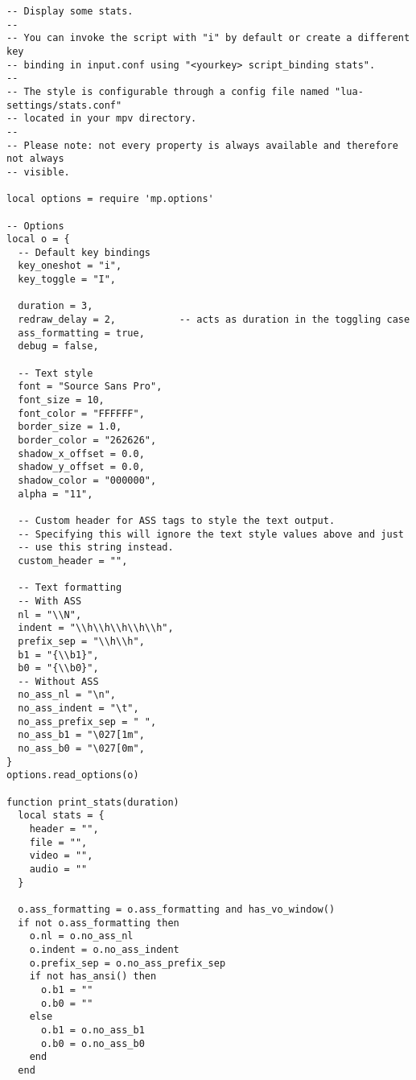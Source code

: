\documentclass[11pt]{article}
\begin{document}
\lstset{language=lua,label= ,caption= ,captionpos=b,numbers=none}
\begin{lstlisting}
-- Display some stats.
--
-- You can invoke the script with "i" by default or create a different key
-- binding in input.conf using "<yourkey> script_binding stats".
--
-- The style is configurable through a config file named "lua-settings/stats.conf"
-- located in your mpv directory.
--
-- Please note: not every property is always available and therefore not always
-- visible.

local options = require 'mp.options'

-- Options
local o = {
  -- Default key bindings
  key_oneshot = "i",
  key_toggle = "I",

  duration = 3,
  redraw_delay = 2,           -- acts as duration in the toggling case
  ass_formatting = true,
  debug = false,

  -- Text style
  font = "Source Sans Pro",
  font_size = 10,
  font_color = "FFFFFF",
  border_size = 1.0,
  border_color = "262626",
  shadow_x_offset = 0.0,
  shadow_y_offset = 0.0,
  shadow_color = "000000",
  alpha = "11",

  -- Custom header for ASS tags to style the text output.
  -- Specifying this will ignore the text style values above and just
  -- use this string instead.
  custom_header = "",

  -- Text formatting
  -- With ASS
  nl = "\\N",
  indent = "\\h\\h\\h\\h\\h",
  prefix_sep = "\\h\\h",
  b1 = "{\\b1}",
  b0 = "{\\b0}",
  -- Without ASS
  no_ass_nl = "\n",
  no_ass_indent = "\t",
  no_ass_prefix_sep = " ",
  no_ass_b1 = "\027[1m",
  no_ass_b0 = "\027[0m",
}
options.read_options(o)

function print_stats(duration)
  local stats = {
    header = "",
    file = "",
    video = "",
    audio = ""
  }

  o.ass_formatting = o.ass_formatting and has_vo_window()
  if not o.ass_formatting then
    o.nl = o.no_ass_nl
    o.indent = o.no_ass_indent
    o.prefix_sep = o.no_ass_prefix_sep
    if not has_ansi() then
      o.b1 = ""
      o.b0 = ""
    else
      o.b1 = o.no_ass_b1
      o.b0 = o.no_ass_b0
    end
  end


\end{lstlisting}
\end{document}
